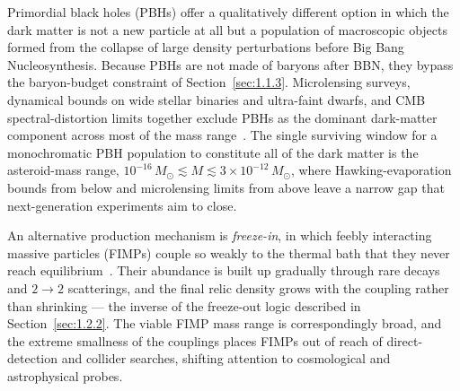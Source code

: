 Primordial black holes (PBHs) offer a qualitatively different option in which the dark matter is not a new particle at all but a population of macroscopic objects formed from the collapse of large density perturbations before Big Bang Nucleosynthesis.
Because PBHs are not made of baryons after BBN, they bypass the baryon-budget constraint of Section~\ref{sec:1.1.3}.
Microlensing surveys, dynamical bounds on wide stellar binaries and ultra-faint dwarfs, and CMB spectral-distortion limits together exclude PBHs as the dominant dark-matter component across most of the mass range~\cite{Carr:2020xqk}.
The single surviving window for a monochromatic PBH population to constitute all of the dark matter is the asteroid-mass range, $10^{-16}\,M_\odot \lesssim M \lesssim 3 \times 10^{-12}\,M_\odot$, where Hawking-evaporation bounds from below and microlensing limits from above leave a narrow gap that next-generation experiments aim to close.

An alternative production mechanism is \emph{freeze-in}, in which feebly interacting massive particles (FIMPs) couple so weakly to the thermal bath that they never reach equilibrium~\cite{Hall:2009bx}.
Their abundance is built up gradually through rare decays and $2 \to 2$ scatterings, and the final relic density grows with the coupling rather than shrinking --- the inverse of the freeze-out logic described in Section~\ref{sec:1.2.2}.
The viable FIMP mass range is correspondingly broad, and the extreme smallness of the couplings places FIMPs out of reach of direct-detection and collider searches, shifting attention to cosmological and astrophysical probes.

